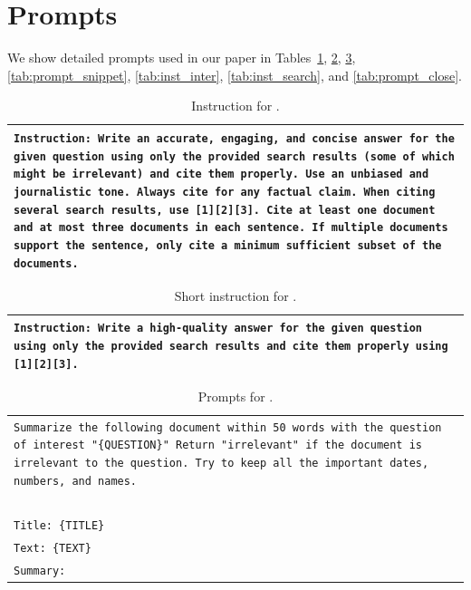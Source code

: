 \documentclass[11pt]{article}
\newcommand{\vani}{{\sc{Vanilla}}}
\newcommand{\summ}{{\sc{Summ}}}
\begin{document}

\section{Prompts}
\label{app_sec:propmt}

We show detailed prompts used in our paper in Tables~\ref{tab:inst_vanilla}, \ref{tab:inst_vanilla_light}, \ref{tab:prompt_summary}, \ref{tab:prompt_snippet}, \ref{tab:inst_inter}, \ref{tab:inst_search}, and \ref{tab:prompt_close}.

\begin{table}[h]
    \centering
    \small
    \begin{tabular}{>{\raggedright\arraybackslash\tt}p{}<{}}
        \toprule
            Instruction: Write an accurate, engaging, and concise answer for the given question using only the provided search results (some of which might be irrelevant) and cite them properly. Use an unbiased and journalistic tone. Always cite for any factual claim. When citing several search results, use [1][2][3]. Cite at least one document and at most three documents in each sentence. If multiple documents support the sentence, only cite a minimum sufficient subset of the documents. \\
        \bottomrule
    \end{tabular}
    \caption{
        Instruction for \vani{}.
    }
    \label{tab:inst_vanilla}
\end{table}

\begin{table}[h]
    \centering
    \small
    \begin{tabular}{>{\raggedright\arraybackslash\tt}p{}<{}}
        \toprule
            Instruction: Write a high-quality answer for the given question using only the provided search results and cite them properly using [1][2][3].\\
        \bottomrule
    \end{tabular}
    \caption{
        Short instruction for \vani{}.
    }
    \label{tab:inst_vanilla_light}
\end{table}

\begin{table}[h]
    \centering
    \small
    \begin{tabular}{>{\raggedright\arraybackslash\tt}p{}<{}}
        \toprule
            Summarize the following document within 50 words with the question of interest "\{QUESTION\}" Return "irrelevant" if the document is irrelevant to the question. Try to keep all the important dates, numbers, and names.\\
            ~\\
            Title: \{TITLE\}\\
            Text: \{TEXT\}\\
            Summary:\\
        \bottomrule
    \end{tabular}
    \caption{
        Prompts for \summ{}.
    }
    \label{tab:prompt_summary}
\end{table}
\end{document}
